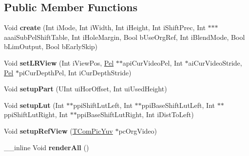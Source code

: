 \subsection*{Public Member Functions}
\begin{DoxyCompactItemize}
\item 
\mbox{\label{class_t_ren_single_model_c_abb9e6e7adbae7343898ef9c52a919d62}} 
Void {\bfseries create} (Int i\+Mode, Int i\+Width, Int i\+Height, Int i\+Shift\+Prec, Int $\ast$$\ast$$\ast$aaai\+Sub\+Pel\+Shift\+Table, Int i\+Hole\+Margin, Bool b\+Use\+Org\+Ref, Int i\+Blend\+Mode, Bool b\+Lim\+Output, Bool b\+Early\+Skip)
\item 
\mbox{\label{class_t_ren_single_model_c_aabf14be813f54e94e170b252bee4ef22}} 
Void {\bfseries set\+L\+R\+View} (Int i\+View\+Pos, \hyperlink{_type_def_8h_af92141699657699b4b547be0c8517541}{Pel} $\ast$$\ast$api\+Cur\+Video\+Pel, Int $\ast$ai\+Cur\+Video\+Stride, \hyperlink{_type_def_8h_af92141699657699b4b547be0c8517541}{Pel} $\ast$pi\+Cur\+Depth\+Pel, Int i\+Cur\+Depth\+Stride)
\item 
\mbox{\label{class_t_ren_single_model_c_a1e6e2db301ff9ceb10fecb076b841390}} 
Void {\bfseries setup\+Part} (U\+Int ui\+Hor\+Offset, Int ui\+Used\+Height)
\item 
\mbox{\label{class_t_ren_single_model_c_a4ce2390d7520feb7fbefc85ff164201e}} 
Void {\bfseries setup\+Lut} (Int $\ast$$\ast$ppi\+Shift\+Lut\+Left, Int $\ast$$\ast$ppi\+Base\+Shift\+Lut\+Left, Int $\ast$$\ast$ppi\+Shift\+Lut\+Right, Int $\ast$$\ast$ppi\+Base\+Shift\+Lut\+Right, Int i\+Dist\+To\+Left)
\item 
\mbox{\label{class_t_ren_single_model_c_a8f73d746e22df086365b46036ecce085}} 
Void {\bfseries setup\+Ref\+View} (\hyperlink{class_t_com_pic_yuv}{T\+Com\+Pic\+Yuv} $\ast$pc\+Org\+Video)
\item 
\mbox{\label{class_t_ren_single_model_c_a44e535642a244dfd3a87771bfca0a8cb}} 
\+\_\+\+\_\+inline Void {\bfseries render\+All} ()
\item 
\mbox{\label{class_t_ren_single_model_c_af6c924dd4879d7117c48a8483f423fcc}} 
$$
\end{DoxyCompactItemize}
